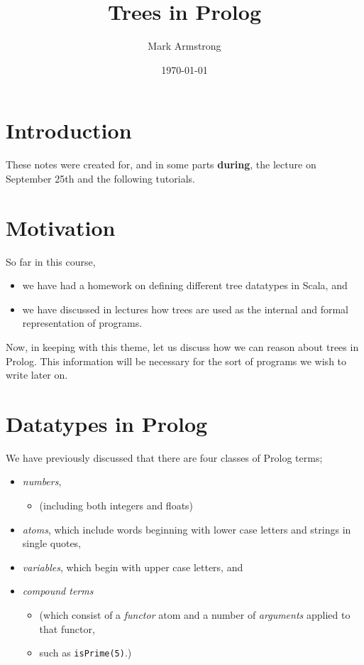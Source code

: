 \documentclass[11pt]{article}
\author{Mark Armstrong}
\date{\today}
\title{Trees in Prolog}
\begin{document}
\maketitle
\tableofcontents


\section{Introduction}
\label{sec:org447d69c}
These notes were created for, and in some parts \textbf{during},
the lecture on September 25th and the following tutorials.

\section{Motivation}
\label{sec:org14ea66b}
So far in this course,
\begin{itemize}
\item we have had a homework on defining different tree datatypes
in Scala, and
\item we have discussed in lectures how trees are used
as the internal and formal representation of programs.
\end{itemize}

Now, in keeping with this theme, let us discuss
how we can reason about trees in Prolog.
This information will be necessary for the sort of programs
we wish to write later on.

\section{Datatypes in Prolog}
\label{sec:org0f7b8e5}
We have previously discussed that there are
four classes of Prolog terms;
\begin{itemize}
\item \emph{numbers},
\begin{itemize}
\item (including both integers and floats)
\end{itemize}
\item \emph{atoms}, which include
words beginning with lower case letters
and strings in single quotes,
\item \emph{variables}, which begin with upper case letters, and
\item \emph{compound terms}
\begin{itemize}
\item (which consist of a \emph{functor} atom and a number
of \emph{arguments} applied to that functor,
\item such as \texttt{isPrime(5)}.)
\end{itemize}
\end{itemize}
\end{document}
